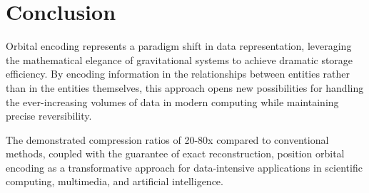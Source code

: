 \section{Conclusion}

Orbital encoding represents a paradigm shift in data representation, leveraging the mathematical elegance of gravitational systems to achieve dramatic storage efficiency. By encoding information in the relationships between entities rather than in the entities themselves, this approach opens new possibilities for handling the ever-increasing volumes of data in modern computing while maintaining precise reversibility.

The demonstrated compression ratios of 20-80x compared to conventional methods, coupled with the guarantee of exact reconstruction, position orbital encoding as a transformative approach for data-intensive applications in scientific computing, multimedia, and artificial intelligence.